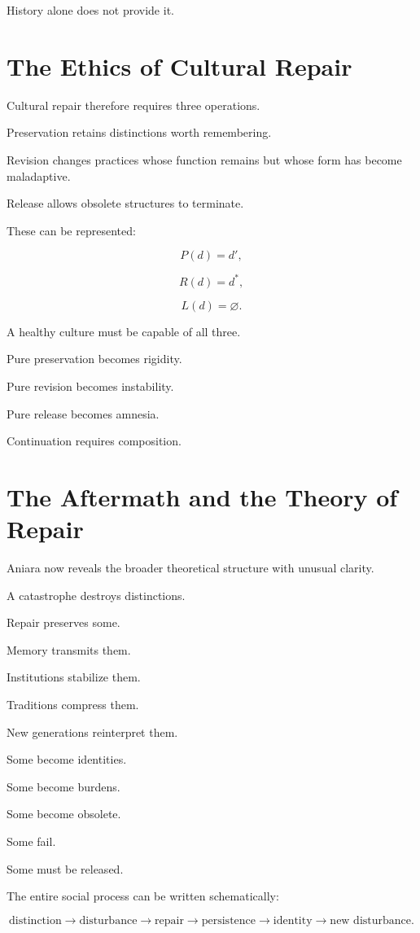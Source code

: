 \documentclass[11pt,oneside]{book}
\theoremstyle{definition}
\theoremstyle{remark}
\begin{document}
History alone does not provide it.

\section{The Ethics of Cultural Repair}

Cultural repair therefore requires three operations.

Preservation retains distinctions worth remembering.

Revision changes practices whose function remains but whose form has become maladaptive.

Release allows obsolete structures to terminate.

These can be represented:

\[
P(d)=d',
\]

\[
R(d)=d^\ast,
\]

\[
L(d)=\varnothing.
\]

A healthy culture must be capable of all three.

Pure preservation becomes rigidity.

Pure revision becomes instability.

Pure release becomes amnesia.

Continuation requires composition.

\section{The Aftermath and the Theory of Repair}

Aniara now reveals the broader theoretical structure with unusual clarity.

A catastrophe destroys distinctions.

Repair preserves some.

Memory transmits them.

Institutions stabilize them.

Traditions compress them.

New generations reinterpret them.

Some become identities.

Some become burdens.

Some become obsolete.

Some fail.

Some must be released.

The entire social process can be written schematically:

\[
\text{distinction}
\rightarrow
\text{disturbance}
\rightarrow
\text{repair}
\rightarrow
\text{persistence}
\rightarrow
\text{identity}
\rightarrow
\text{new disturbance}.
\]
\end{document}
